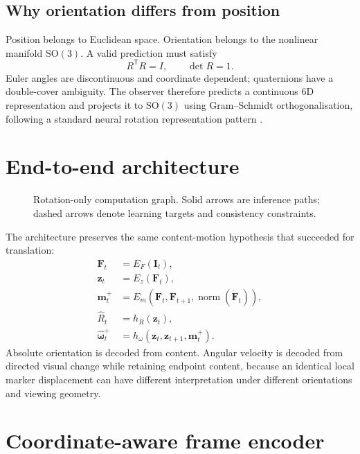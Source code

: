 \documentclass[11pt,a4paper]{article}
\newcommand{\SO}{\mathrm{SO}}
\newcommand{\vect}[1]{\mathbf{#1}}
\begin{document}
\subsection{Why orientation differs from position}
Position belongs to Euclidean space. Orientation belongs to the nonlinear manifold $\SO(3)$. A valid prediction must satisfy
\begin{equation}
R^\mathsf T R=I,\qquad \det R=1.
\end{equation}
Euler angles are discontinuous and coordinate dependent; quaternions have a double-cover ambiguity. The observer therefore predicts a continuous 6D representation and projects it to $\SO(3)$ using Gram--Schmidt orthogonalisation, following a standard neural rotation representation pattern \citep{zhou2019rotation6d}.

\section{End-to-end architecture}
\begin{figure}[H]
\centering
\resizebox{\textwidth}{!}{}
\caption{Rotation-only computation graph. Solid arrows are inference paths; dashed arrows denote learning targets and consistency constraints.}
\label{fig:architecture}
\end{figure}

The architecture preserves the same content-motion hypothesis that succeeded for translation:
\begin{align}
\vect F_t &= E_F(\vect I_t),\\
\vect z_t &= E_z(\vect F_t),\\
\vect m_t^+ &= E_m(\vect F_t,\vect F_{t+1},\operatorname{norm}(\dot{\vect F}_t)),\\
\hat R_t &= h_R(\vect z_t),\\
\hat{\vect\omega}_t^+ &= h_\omega(\vect z_t,\vect z_{t+1},\vect m_t^+).
\end{align}
Absolute orientation is decoded from content. Angular velocity is decoded from directed visual change while retaining endpoint content, because an identical local marker displacement can have different interpretation under different orientations and viewing geometry.

\section{Coordinate-aware frame encoder}
\end{document}
